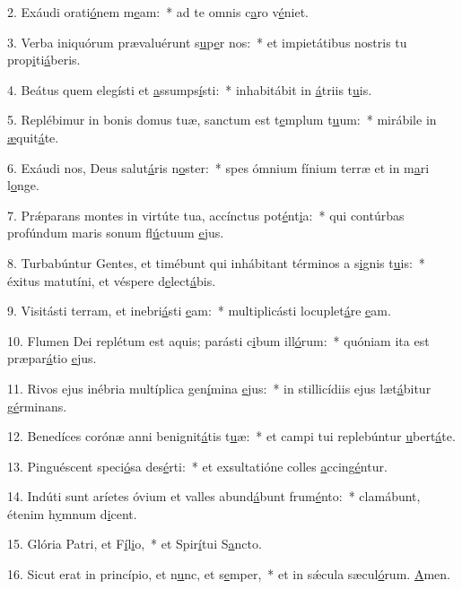 2. Exáudi orati\uline{ó}nem m\uline{e}am:~* ad te omnis c\uline{a}ro v\uline{é}niet.\par 
3. Verba iniquórum prævaluérunt s\uline{u}p\uline{e}r nos:~* et impietátibus nostris tu prop\uline{i}ti\uline{á}beris.\par 
4. Beátus quem elegísti et \uline{a}ssumps\uline{í}sti:~* inhabitábit in \uline{á}triis t\uline{u}is.\par 
5. Replébimur in bonis domus tuæ, sanctum est t\uline{e}mplum t\uline{u}um:~* mirábile in \uline{æ}quit\uline{á}te.\par 
6. Exáudi nos, Deus salut\uline{á}ris n\uline{o}ster:~* spes ómnium fínium terræ et in m\uline{a}ri l\uline{o}nge.\par 
7. Prǽparans montes in virtúte tua, accínctus pot\uline{é}nt\uline{i}a:~* qui contúrbas profúndum maris sonum fl\uline{ú}ctuum \uline{e}jus.\par 
8. Turbabúntur Gentes, et timébunt qui inhábitant términos a s\uline{i}gnis t\uline{u}is:~* éxitus matutíni, et véspere d\uline{e}lect\uline{á}bis.\par 
9. Visitásti terram, et inebri\uline{á}sti \uline{e}am:~* multiplicásti locuplet\uline{á}re \uline{e}am.\par 
10. Flumen Dei replétum est aquis; parásti c\uline{i}bum ill\uline{ó}rum:~* quóniam ita est præpar\uline{á}tio \uline{e}jus.\par 
11. Rivos ejus inébria multíplica gen\uline{í}mina \uline{e}jus:~* in stillicídiis ejus læt\uline{á}bitur g\uline{é}rminans.\par 
12. Benedíces corónæ anni benignit\uline{á}tis t\uline{u}æ:~* et campi tui replebúntur \uline{u}bert\uline{á}te.\par 
13. Pinguéscent speci\uline{ó}sa des\uline{é}rti:~* et exsultatióne colles \uline{a}ccing\uline{é}ntur.\par 
14. Indúti sunt aríetes óvium et valles abund\uline{á}bunt frum\uline{é}nto:~* clamábunt, étenim h\uline{y}mnum d\uline{i}cent.\par 
15. Glória Patri, et F\uline{í}l\uline{i}o,~* et Spir\uline{í}tui S\uline{a}ncto.\par 
16. Sicut erat in princípio, et n\uline{u}nc, et s\uline{e}mper,~* et in sǽcula sæcul\uline{ó}rum. \uline{A}men.\par 
